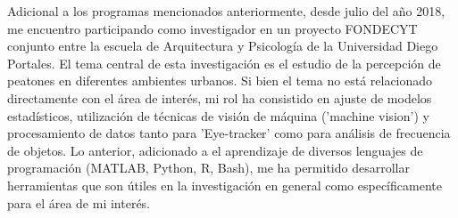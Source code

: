 \documentclass[11pt]{article}
\begin{document}
Adicional a los programas mencionados anteriormente, desde julio del año 2018,
me encuentro participando como investigador en un proyecto FONDECYT conjunto
entre la escuela de Arquitectura y Psicología de la Universidad Diego
Portales. El tema central de esta investigación es el estudio de la percepción
de peatones en diferentes ambientes urbanos. Si bien el tema no está
relacionado directamente con el área de interés, mi rol ha consistido en
ajuste de modelos estadísticos, utilización de técnicas de visión de máquina
('machine vision') y procesamiento de datos tanto para 'Eye-tracker' como para
análisis de frecuencia de objetos. Lo anterior, adicionado a el aprendizaje de
diversos lenguajes de programación (MATLAB, Python, R, Bash), me ha permitido
desarrollar herramientas que son útiles en la investigación en general como
específicamente para el área de mi interés.
\begin{Latex}
\pagebreak
\end{Latex}


\end{document}
